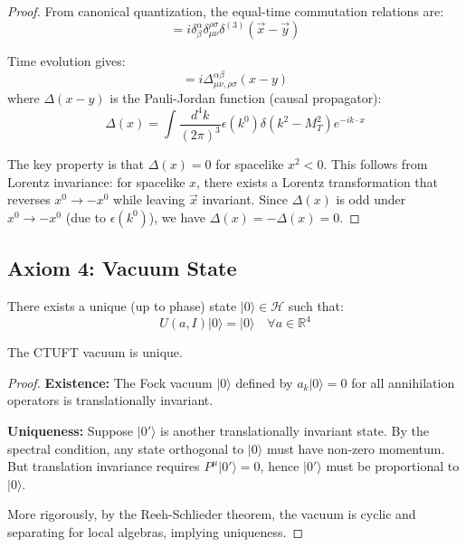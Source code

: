 \begin{proof}
From canonical quantization, the equal-time commutation relations are:
\begin{equation}
    [\mathcal{T}^\alpha_{\mu\nu}(t, \vec{x}), \pi_\beta^{\rho\sigma}(t, \vec{y})] = i\delta^\alpha_\beta \delta^{\rho\sigma}_{\mu\nu} \delta^{(3)}(\vec{x} - \vec{y})
\end{equation}

Time evolution gives:
\begin{equation}
    [\mathcal{T}^\alpha_{\mu\nu}(x), \mathcal{T}^\beta_{\rho\sigma}(y)] = i\Delta^{\alpha\beta}_{\mu\nu,\rho\sigma}(x-y)
\end{equation}
where $\Delta(x-y)$ is the Pauli-Jordan function (causal propagator):
\begin{equation}
    \Delta(x) = \int \frac{d^4k}{(2\pi)^3} \epsilon(k^0) \delta(k^2 - M_T^2) e^{-ik \cdot x}
\end{equation}

The key property is that $\Delta(x) = 0$ for spacelike $x^2 < 0$. This follows from Lorentz invariance: for spacelike $x$, there exists a Lorentz transformation that reverses $x^0 \to -x^0$ while leaving $\vec{x}$ invariant. Since $\Delta(x)$ is odd under $x^0 \to -x^0$ (due to $\epsilon(k^0)$), we have $\Delta(x) = -\Delta(x) = 0$.
\end{proof}

\subsection{Axiom 4: Vacuum State}

\begin{axiom}
There exists a unique (up to phase) state $|0\rangle \in \mathcal{H}$ such that:
\begin{equation}
    U(a, I)|0\rangle = |0\rangle \quad \forall a \in \mathbb{R}^4
\end{equation}
\end{axiom}

\begin{theorem}
The CTUFT vacuum is unique.
\end{theorem}

\begin{proof}
\textbf{Existence:} The Fock vacuum $|0\rangle$ defined by $a_k |0\rangle = 0$ for all annihilation operators is translationally invariant.

\textbf{Uniqueness:} Suppose $|0'\rangle$ is another translationally invariant state. By the spectral condition, any state orthogonal to $|0\rangle$ must have non-zero momentum. But translation invariance requires $P^\mu |0'\rangle = 0$, hence $|0'\rangle$ must be proportional to $|0\rangle$.

More rigorously, by the Reeh-Schlieder theorem, the vacuum is cyclic and separating for local algebras, implying uniqueness.
\end{proof}

